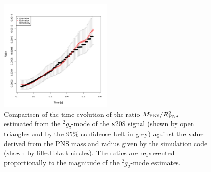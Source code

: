 \begin{figure}
 \centering
 \includegraphics[width=0.5\textwidth]{plots/ratio}
 \caption{Comparison of the time evolution of the ratio $M_{\rm PNS}/R_{\rm PNS}^2$ estimated from the $\mbox{}^2 g_2$-mode of the {\texttt s20S} signal (shown by open triangles and by the 95\% confidence belt in grey) against the value derived from the PNS mass and radius given by the simulation code (shown by filled black circles).  The ratios are represented proportionally to the magnitude of the $\mbox{}^2 g_2$-mode estimates.}
 \label{fig:ratio}
\end{figure}


